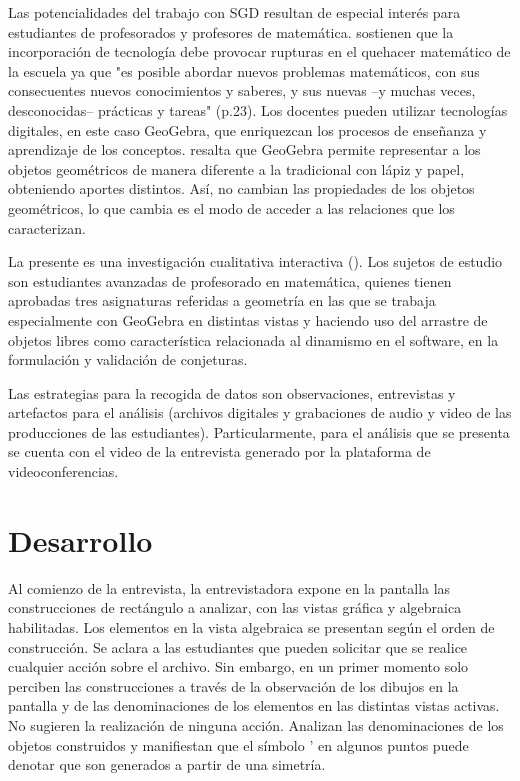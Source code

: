 \documentclass[oneside,spanish]{amsart}
\numberwithin{equation}{section}
\numberwithin{figure}{section}
\theoremstyle{definition}
\begin{document}
Las potencialidades del trabajo con SGD resultan de especial interés para estudiantes de profesorados y profesores de matemática. \citet{novembre15} sostienen que la incorporación de tecnología debe provocar rupturas en el quehacer matemático de la escuela ya que "es posible abordar nuevos problemas matemáticos, con sus consecuentes nuevos conocimientos y saberes, y sus nuevas --y muchas veces, desconocidas-- prácticas y tareas" (p.23). Los docentes pueden utilizar tecnologías digitales, en este caso GeoGebra, que enriquezcan los procesos de enseñanza y aprendizaje de los conceptos. \citet{itzcovich20} resalta que GeoGebra permite representar a los objetos geométricos de manera diferente a la tradicional con lápiz y papel, obteniendo aportes distintos. Así, no cambian las propiedades de los objetos geométricos, lo que cambia es el modo de acceder a las relaciones que los caracterizan.

La presente es una investigación cualitativa interactiva (\citet{mcmillan05}). Los sujetos de estudio son estudiantes avanzadas de profesorado en matemática, quienes tienen aprobadas tres asignaturas referidas a geometría en las que se trabaja especialmente con GeoGebra en distintas vistas y haciendo uso del arrastre de objetos libres como característica relacionada al dinamismo en el software, en la formulación y validación de conjeturas.

Las estrategias para la recogida de datos son observaciones, entrevistas y artefactos para el análisis (archivos digitales y grabaciones de audio y video de las producciones de las estudiantes). Particularmente, para el análisis que se presenta se cuenta con el video de la entrevista generado por la plataforma de videoconferencias.

\section{Desarrollo}

Al comienzo de la entrevista, la entrevistadora expone en la pantalla las construcciones de rectángulo a analizar, con las vistas gráfica y algebraica habilitadas. Los elementos en la vista algebraica se presentan según el orden de construcción. Se aclara a las estudiantes que pueden solicitar que se realice cualquier acción sobre el archivo. Sin embargo, en un primer momento solo perciben las construcciones a través de la observación de los dibujos en la pantalla y de las denominaciones de los elementos en las distintas vistas activas. No sugieren la realización de ninguna acción. Analizan las denominaciones de los objetos construidos y manifiestan que el símbolo ’ en algunos puntos puede denotar que son generados a partir de una simetría. 
\end{document}
